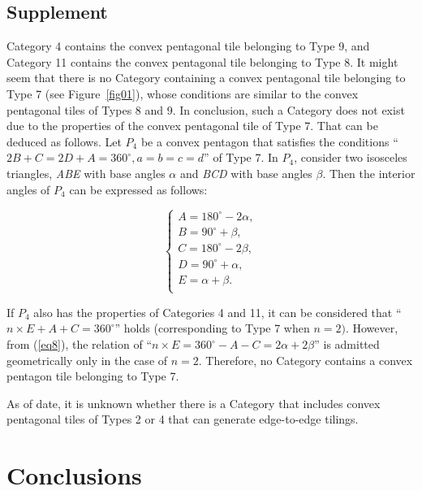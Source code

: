 \documentclass[11pt, a4paper]{article}
\begin{document}
\subsection{Supplement}
\label{subsection2.3}

Category 4 contains the convex pentagonal tile belonging to Type 9, and 
Category 11 contains the convex pentagonal tile belonging to Type 8. It 
might seem that there is no Category containing a convex pentagonal tile 
belonging to Type 7 (see Figure~\ref{fig01}), whose conditions are similar to the 
convex pentagonal tiles of Types 8 and 9. In conclusion, such a Category 
does not exist due to the properties of the convex pentagonal tile of Type 
7. That can be deduced as follows. Let $P_{4}$ be a convex pentagon that 
satisfies the conditions ``$2B+C = 2D+A = 360^ \circ, a = b = c = d$'' of Type 7. 
In $P_{4}$, consider two isosceles triangles, \textit{ABE} with base angles 
$\alpha $ and \textit{BCD} with base angles $\beta $. Then the interior 
angles of $P_{4}$ can be expressed as follows:


\begin{equation}
\label{eq8}
\left\{ {\begin{array}{l}
 A = 180^ \circ - 2\alpha , \\ 
 B = 90^ \circ + \beta , \\ 
 C = 180^ \circ - 2\beta , \\ 
 D = 90^ \circ + \alpha , \\ 
 E = \alpha + \beta . \\ 
 \end{array}} \right.
\end{equation}




\noindent
If $P_{4}$ also has the properties of Categories 4 and 11, it can be 
considered that ``$n\times E + A + C = 360^ \circ $'' holds (corresponding 
to Type 7 when $n = 2)$. However, from (\ref{eq8}), the relation of 
``$n\times E = 360^ \circ - A - C = 2\alpha + 2\beta $'' is admitted 
geometrically only in the case of $n = 2$. Therefore, no Category 
contains a convex pentagon tile belonging to Type 7.

As of date, it is unknown whether there is a Category that includes convex 
pentagonal tiles of Types 2 or 4 that can generate edge-to-edge tilings.





\section{Conclusions}
\label{section3}
\end{document}
